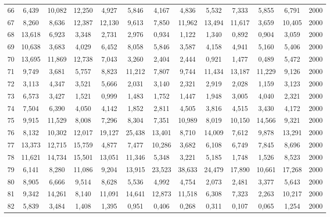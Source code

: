 {\begin{longtable}{ >{\footnotesize}ccccccccccccc}
66  & 6,439  & 10,082 & 12,250 & 4,927  & 5,846  & 4,167  & 4,836  & 5,532  & 7,333  & 5,855  & 6,791  & 2000 \\
67  & 8,260  & 8,636  & 12,387 & 12,130 & 9,613  & 7,850  & 11,962 & 13,494 & 11,617 & 3,659  & 10,405 & 2000 \\
68  & 13,618 & 6,923  & 3,348  & 2,731  & 2,976  & 0,934  & 1,122  & 1,340  & 0,892  & 0,904  & 3,059  & 2000 \\
69  & 10,638 & 3,683  & 4,029  & 6,452  & 8,058  & 5,846  & 3,587  & 4,158  & 4,941  & 5,160  & 5,406  & 2000 \\
70  & 13,695 & 11,869 & 12,738 & 7,043  & 3,260  & 2,404  & 2,444  & 0,921  & 1,477  & 0,489  & 5,472  & 2000 \\
71  & 9,749  & 3,681  & 5,757  & 8,823  & 11,212 & 7,807  & 9,744  & 11,434 & 13,187 & 11,229 & 9,126  & 2000 \\
72  & 3,113  & 4,347  & 3,521  & 5,666  & 2,031  & 3,140  & 2,321  & 2,919  & 2,028  & 1,159  & 3,123  & 2000 \\
73  & 6,573  & 3,427  & 1,521  & 0,999  & 1,483  & 1,752  & 1,447  & 1,948  & 3,005  & 4,040  & 2,321  & 2000 \\
74  & 7,504  & 6,390  & 4,050  & 4,142  & 1,852  & 2,811  & 4,505  & 3,816  & 4,515  & 3,430  & 4,172  & 2000 \\
75  & 9,915  & 11,529 & 8,008  & 7,296  & 8,304  & 7,351  & 10,989 & 8,019  & 10,150 & 14,566 & 9,321  & 2000 \\
76  & 8,132  & 10,302 & 12,017 & 19,127 & 25,438 & 13,401 & 8,710  & 14,009 & 7,612  & 9,878  & 13,291 & 2000 \\
77  & 13,373 & 12,715 & 15,759 & 4,877  & 7,477  & 10,286 & 3,682  & 6,108  & 6,749  & 7,845  & 8,696  & 2000 \\
78  & 11,621 & 14,734 & 15,501 & 13,051 & 11,346 & 5,348  & 3,221  & 5,185  & 1,748  & 1,526  & 8,523  & 2000 \\
79  & 6,141  & 8,280  & 11,086 & 9,204  & 13,915 & 23,523 & 38,633 & 24,479 & 17,890 & 10,661 & 17,268 & 2000 \\
80  & 8,905  & 6,666  & 9,514  & 8,628  & 5,536  & 4,992  & 4,754  & 2,073  & 2,481  & 3,377  & 5,643  & 2000 \\
81  & 9,342  & 14,261 & 8,140  & 11,091 & 14,641 & 12,873 & 11,518 & 6,308  & 7,323  & 2,263  & 10,217 & 2000 \\
82  & 5,839  & 3,484  & 1,408  & 1,395  & 0,951  & 0,406  & 0,268  & 0,311  & 0,107  & 0,065  & 1,254  & 2000 \\

\end{longtable}}
